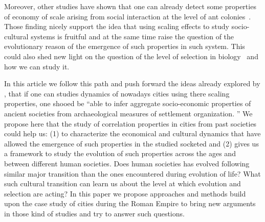 \documentclass[a4paper,11pt]{article}
\begin{document}
Moreover, other studies have shown that one can already detect some properties of economy of scale arising from social interaction at the level of ant colonies~\citep{hou2010energeticbasisofcoloniallivinginsocialinsects}. Those finding nicely support the idea that using scaling effects to study socio-cultural systems is fruitful and at the same time raise the question of the evolutionary reason of the emergence of such properties in such system. This could also shed new light on the question of the level of selection in biology~\citep{okasha2006evolution} and how we can study it.


In this article we follow this path and push forward the ideas already explored by \cite{ortman2014theprehistoryofurbanscaling}, that if one can studies dynamics of nowadays cities using there scaling properties, one shooed be ``able to infer aggregate socio-economic properties of ancient societies from archaeological measures of settlement organization. '' We propose here that the study of correlation properties in cities from past societies could help us: (1) to characterize the economical and cultural dynamics that have allowed the emergence of such properties in the studied socketed and (2) gives us a framework to study the evolution of such properties across the ages and between different human societies. Does human societies has evolved following similar major transition than the ones encountered during evolution of life? What such cultural transition can learn us about the level at which evolution and selection are acting?  In this paper we propose approaches and methods build upon the case study of cities during the Roman Empire to bring new  arguments in those kind of studies and try to answer such questions.




\end{document}
